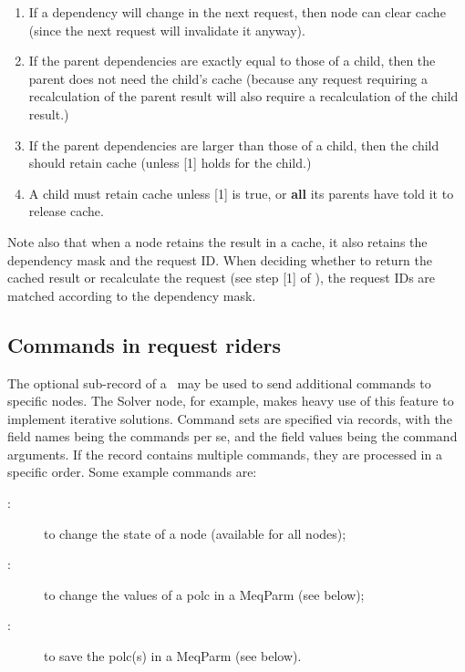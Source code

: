 \documentclass[10pt]{article}
\begin{document}
  \begin{enumerate}
  
  \item If a dependency will change in the next request, then node can clear
    cache (since the next request will invalidate it anyway).

  \item If the parent dependencies are exactly equal to those of a child, then
    the parent does not need the child's cache (because any request requiring a
    recalculation of the parent result will also require a recalculation of the
    child result.)

  \item If the parent dependencies are larger than those of a child, then the 
    child should retain cache (unless [1] holds for the child.) 

  \item A child must retain cache unless [1] is true, or {\bf all} its parents
    have told it to release cache.

  \end{enumerate}
  
  Note also that when a node retains the result in a cache, it also retains the
  dependency mask and the request ID. When deciding whether to return the
  cached result or recalculate the request (see step [1] of ),
  the request IDs are matched according to the dependency mask.
  
\subsection{Commands in request riders}

  The optional  sub-record of a \Request\ may be used to send
  additional commands to specific nodes. The Solver node, for example, makes
  heavy use of this feature to implement iterative solutions. Command sets are
  specified via records, with the field names being the commands per se, and
  the field values being the command arguments. If the record contains multiple
  commands, they are processed in a specific order. Some example commands are:

  \begin{description}
  
  \item[:] to change the state of a node (available for all nodes);
  
  \item[:] to change the values of a polc in a MeqParm (see
  below);
  
  \item[:] to save the polc(s) in a MeqParm (see below).
  
  \end{description}
  
\end{document}
